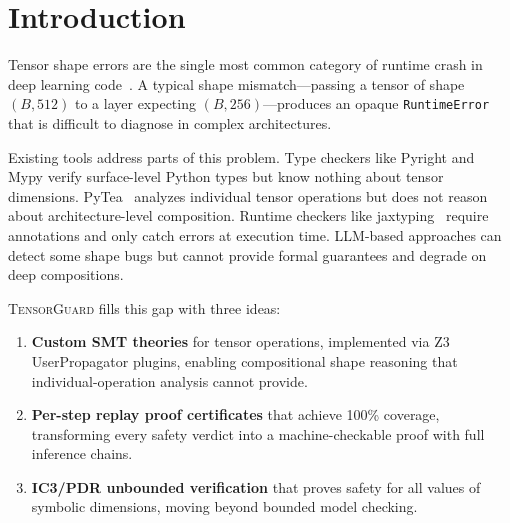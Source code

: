 \documentclass[11pt]{article}
\begin{document}
\section{Introduction}\label{sec:intro}

Tensor shape errors are the single most common category of runtime crash
in deep learning code~\cite{islam19,zhang18}.  A typical shape mismatch---passing
a tensor of shape $(B, 512)$ to a layer expecting $(B, 256)$---produces an
opaque \texttt{RuntimeError} that is difficult to diagnose in complex
architectures.

Existing tools address parts of this problem.  Type checkers like
Pyright and Mypy verify surface-level Python types but know nothing
about tensor dimensions.  PyTea~\cite{pytea} analyzes individual tensor
operations but does not reason about architecture-level composition.
Runtime checkers like jaxtyping~\cite{jaxtyping} require annotations
and only catch errors at execution time.  LLM-based approaches
can detect some shape bugs but cannot provide formal guarantees and
degrade on deep compositions.

\textsc{TensorGuard} fills this gap with three ideas:
\begin{enumerate}[leftmargin=2em]
  \item \textbf{Custom SMT theories} for tensor operations, implemented
    via Z3 UserPropagator plugins, enabling compositional shape reasoning
    that individual-operation analysis cannot provide.
  \item \textbf{Per-step replay proof certificates} that achieve 100\%
    coverage, transforming every safety verdict into a machine-checkable
    proof with full inference chains.
  \item \textbf{IC3/PDR unbounded verification} that proves safety for
    all values of symbolic dimensions, moving beyond bounded model
    checking.
\end{enumerate}
\end{document}

